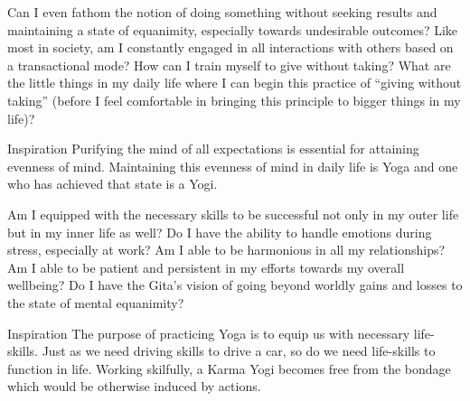 \newpage
\begin{mananam}{}
\mananamtext Can I even fathom the notion of doing something without seeking results and maintaining a state of equanimity, especially towards undesirable outcomes? Like most in society, am I constantly engaged in all interactions with others based on a transactional mode? How can I train myself to give without taking? What are the little things in my daily life where I can begin this practice of “giving without taking” (before I feel comfortable in bringing this principle to bigger things in my life)?
\end{mananam}
\WritingHand{}
\begin{inspiration}{\mananamfont Inspiration}
\mananamtext Purifying the mind of all expectations is essential for attaining evenness of mind. Maintaining this evenness of mind in daily life is Yoga and one who has achieved that state is a Yogi.
\end{inspiration}
\newpage

\newpage
\begin{mananam}{}
\mananamtext Am I equipped with the necessary skills to be successful not only in my outer life but in my inner life as well? Do I have the ability to handle emotions during stress, especially at work? Am I able to be harmonious in all my relationships? Am I able to be patient and persistent in my efforts towards my overall wellbeing? Do I have the Gita’s vision of going beyond worldly gains and losses to the state of mental equanimity?
\end{mananam}
\WritingHand{}
\begin{inspiration}{\mananamfont Inspiration}
\mananamtext The purpose of practicing Yoga is to equip us with necessary life-skills. Just as we need driving skills to drive a car, so do we need life-skills to function in life. Working skilfully, a Karma Yogi becomes free from the bondage which would be otherwise induced by actions.
\end{inspiration}
\newpage



